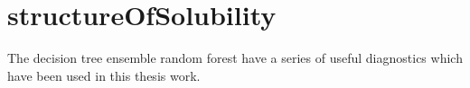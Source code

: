 \chapter{structureOfSolubility}

The decision tree ensemble random forest have a series of useful diagnostics which have been used in this thesis work.



